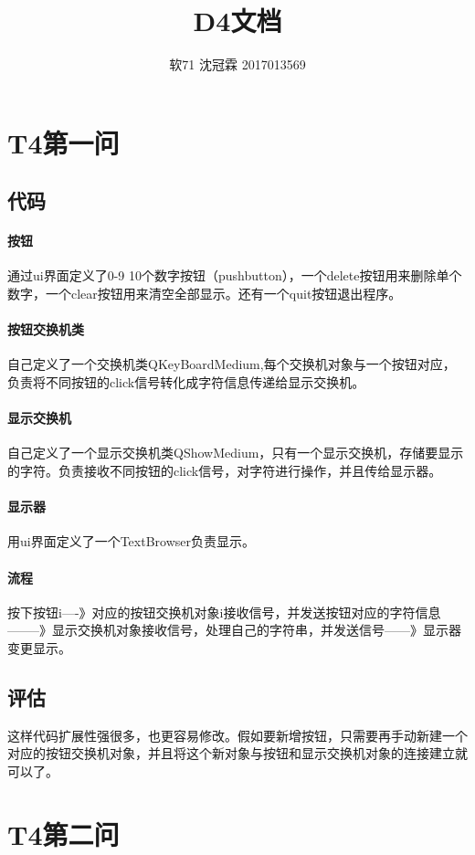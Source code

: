 \documentclass{article}
\title{D4文档}
\author{软71 沈冠霖 2017013569}
\begin{document}
\begin{CJK}{UTF8}{gkai}
\maketitle
\section{T4第一问} 
\subsection{代码} 
\paragraph{按钮}通过ui界面定义了0-9 10个数字按钮（pushbutton），一个delete按钮用来删除单个数字，一个clear按钮用来清空全部显示。还有一个quit按钮退出程序。
\paragraph{按钮交换机类}自己定义了一个交换机类QKeyBoardMedium,每个交换机对象与一个按钮对应，负责将不同按钮的click信号转化成字符信息传递给显示交换机。
\paragraph{显示交换机}自己定义了一个显示交换机类QShowMedium，只有一个显示交换机，存储要显示的字符。负责接收不同按钮的click信号，对字符进行操作，并且传给显示器。
\paragraph{显示器}用ui界面定义了一个TextBrowser负责显示。
\paragraph{流程}按下按钮i----》对应的按钮交换机对象i接收信号，并发送按钮对应的字符信息--------》显示交换机对象接收信号，处理自己的字符串，并发送信号------》显示器变更显示。
\subsection{评估}这样代码扩展性强很多，也更容易修改。假如要新增按钮，只需要再手动新建一个对应的按钮交换机对象，并且将这个新对象与按钮和显示交换机对象的连接建立就可以了。
\\
\section{T4第二问} 

\end{CJK}
\end{document}
